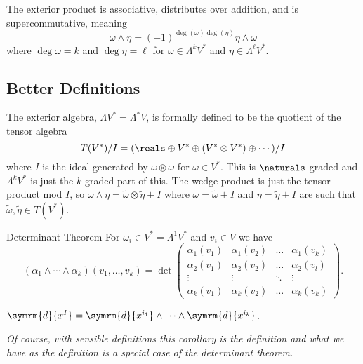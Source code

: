 \documentclass[fleqn]{NotesClass}
\renewcommand{\dl}{\symrm{d}}
\begin{document}
    \begin{lma}{}{}
        The exterior product is associative, distributes over addition, and is supercommutative, meaning
        \begin{equation}
            \omega \wedge \eta = (-1)^{\deg(\omega) \deg(\eta)}\eta \wedge \omega
        \end{equation}
        where \(\deg \omega = k\) and \(\deg \eta = \ell\) for \(\omega \in \Lambda^kV^*\) and \(\eta \in \Lambda^\ell V^*\).
    \end{lma}
    
    \subsection{Better Definitions}
    The exterior algebra, \(\Lambda V^* = \Lambda^* V\), is formally defined to be the quotient of the tensor algebra
    \begin{equation}
        T(V^*)/I = (\reals \oplus V^* \oplus (V^* \otimes V^*) \oplus \dotsb)/I
    \end{equation}
    where \(I\) is the ideal generated by \(\omega \otimes \omega\) for \(\omega \in V^*\).
    This is \(\naturals\)-graded and \(\Lambda^kV^*\) is just the \(k\)-graded part of this.
    The wedge product is just the tensor product mod \(I\), so \(\omega \wedge \eta = \tilde{\omega} \otimes \tilde{\eta} + I\) where \(\omega = \tilde{\omega} + I\) and \(\eta = \tilde{\eta} + I\) are such that \(\tilde{\omega}, \tilde{\eta} \in T(V^*)\).
    
    \begin{thm}{Determinant Theorem}{}
        For \(\omega_i \in V^* = \Lambda^1V^*\) and \(v_i \in V\) we have
        \begin{equation}
            (\alpha_1 \wedge \dotsb \wedge \alpha_k)(v_1, \dotsc, v_k) = \det
            \begin{pmatrix}
                \alpha_1(v_1) & \alpha_1(v_2) & \dots & \alpha_1(v_k)\\
                \alpha_2(v_1) & \alpha_2(v_2) & \dots & \alpha_2(v_l)\\
                \vdots & \vdots & \ddots & \vdots\\
                \alpha_k(v_1) & \alpha_k(v_2) & \dots & \alpha_k(v_k)
            \end{pmatrix}
            .
        \end{equation}
    \end{thm}
    
    \begin{crl}{}{}
        \(\dl{x^I} = \dl{x^{i_1}} \wedge \dotsb \wedge \dl{x^{i_k}}\).
    \end{crl}
    \textit{Of course, with sensible definitions this corollary is the definition and what we have as the definition is a special case of the determinant theorem.}
    
\end{document}
